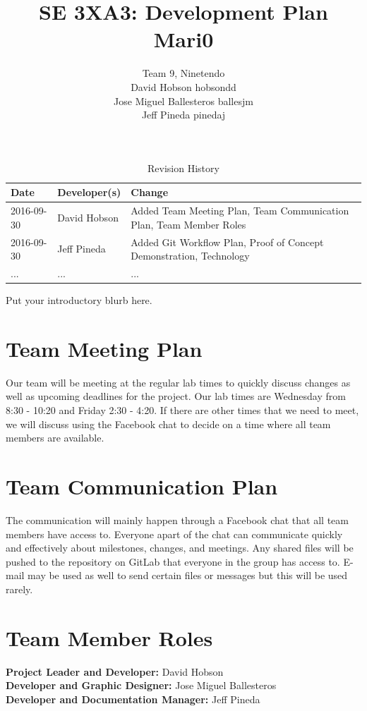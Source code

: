 \documentclass{article}
\title{SE 3XA3: Development Plan\\Mari0}
\author{Team 9, Ninetendo
		\\ David Hobson hobsondd
		\\ Jose Miguel Ballesteros ballesjm
		\\ Jeff Pineda pinedaj
}
\date{}
\begin{document}
\begin{table}[hp]
\caption{Revision History} \label{TblRevisionHistory}
\begin{tabularx}{\textwidth}{llX}
\toprule
\textbf{Date} & \textbf{Developer(s)} & \textbf{Change}\\
\midrule
2016-09-30 & David Hobson & Added Team Meeting Plan, Team Communication Plan, Team Member Roles\\
2016-09-30 & Jeff Pineda & Added Git Workflow Plan, Proof of Concept Demonstration, Technology\\
... & ... & ...\\
\bottomrule
\end{tabularx}
\end{table}

\newpage

\maketitle

Put your introductory blurb here.

\section{Team Meeting Plan}
Our team will be meeting at the regular lab times to quickly discuss changes as well as upcoming deadlines for the project. Our lab times are Wednesday from 8:30 - 10:20 and Friday 2:30 - 4:20. If there are other times that we need to meet, we will discuss using the Facebook chat to decide on a time where all team members are available. 

\section{Team Communication Plan}
The communication will mainly happen through a Facebook chat that all team members have access to. Everyone apart of the chat can communicate quickly and effectively about milestones, changes, and meetings. Any shared files will be pushed to the repository on GitLab that everyone in the group has access to. E-mail may be used as well to send certain files or messages but this will be used rarely. 

\section{Team Member Roles}
\textbf{Project Leader and Developer:}  David Hobson\\
\textbf{Developer and Graphic Designer:}  Jose Miguel Ballesteros\\
\textbf{Developer and Documentation Manager:}  Jeff Pineda\\
\end{document}
